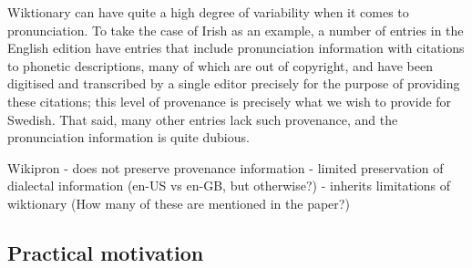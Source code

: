 \documentclass{Interspeech}
\begin{document}

Wiktionary can have quite a high degree of variability when it comes to pronunciation. To take the case of Irish as an example, a number of entries in the English edition have entries that include pronunciation information with citations to phonetic descriptions, many of which are out of copyright, and have been digitised and transcribed by a single editor precisely for the purpose of providing these citations; this level of provenance is precisely what we wish to provide for Swedish. That said, many other entries lack such provenance, and the pronunciation information is quite dubious. 

Wikipron
- does not preserve provenance information
- limited preservation of dialectal information (en-US vs en-GB, but otherwise?)
- inherits limitations of wiktionary
(How many of these are mentioned in the paper?)


\subsection{Practical motivation}
\end{document}
